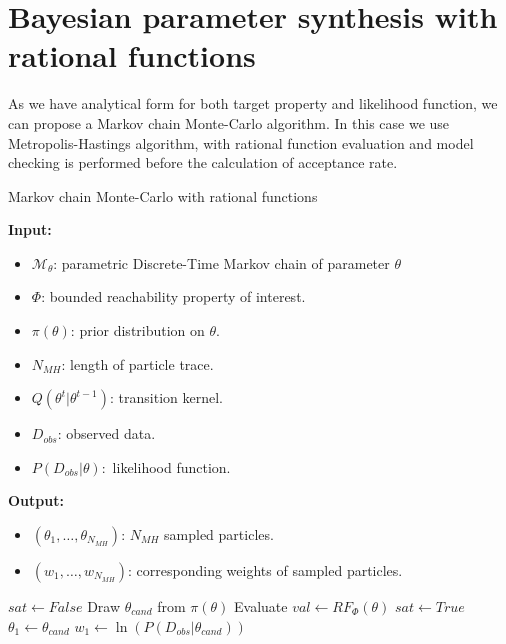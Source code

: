 \section{Bayesian parameter synthesis with rational functions}
\newpage
As we have analytical form for both target property and likelihood function, we can propose a Markov
chain Monte-Carlo algorithm. In this case we use Metropolis-Hastings algorithm, with rational
function evaluation and model checking is performed before the calculation of acceptance rate.
\begin{algorithm}[H]
      \caption{Markov chain Monte-Carlo with rational functions}
      \label{rf-mcmc-alg}
      \hspace*{\algorithmicindent} \textbf{Input:}
      \begin{itemize}
            \item $\mathcal{M}_\theta$: parametric Discrete-Time Markov chain of parameter $\theta$
            \item $\Phi$: bounded reachability property of interest.
            \item $\pi(\theta)$: prior distribution on $\theta$.
            \item $N_{MH}$: length of particle trace.
            \item $Q(\theta^t|\theta^{t-1})$: transition kernel.
            \item $D_{obs}$: observed data.
            \item $P(D_{obs}|\theta):$ likelihood function.
      \end{itemize}
      \hspace*{\algorithmicindent} \textbf{Output:}
      \begin{itemize}
            \item $(\theta_1,\ldots,\theta_{N_{MH}})$: $N_{MH}$ sampled particles.
            \item $(w_1,\ldots,w_{N_{MH}})$: corresponding weights of sampled particles.
      \end{itemize}
      \begin{algorithmic}[1]
            \State $sat \leftarrow False$
            \State Draw $\theta_{cand}$ from $\pi(\theta)$
            \State Evaluate $val \leftarrow RF_{\Phi}(\theta)$
            \State $sat \leftarrow True$
            \EndIf
            \EndWhile
            \State $\theta_1 \leftarrow  \theta_{cand}$
            \State $w_1 \leftarrow  \ln(P(D_{obs}|\theta_{cand}))$
      \end{algorithmic}
\end{algorithm}

